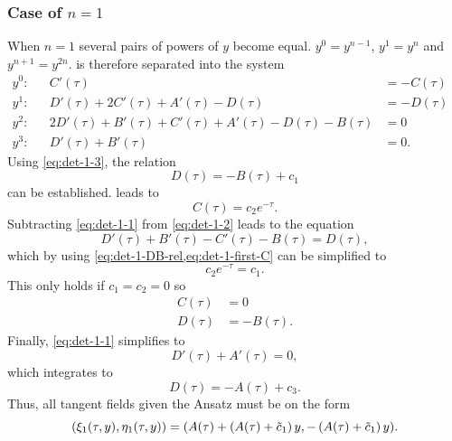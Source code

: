 \subsubsection{Case of \texorpdfstring{\(n=1\)}{n is 1}}

When \(n=1\) several pairs of powers of \(y\) become equal.
\(y^0 = y^{n-1}\), \(y^1 = y^n\) and \(y^{n+1} = y^{2n}\).
 is therefore separated into the system
\begin{subequations}
  \begin{flalign}
    y^0:  && C'(\tau) &= -C(\tau) &\label{eq:det-1-0}\\
    y^1:  && D'(\tau) + 2C'(\tau) + A'(\tau) - D(\tau) &= -D(\tau) &\label{eq:det-1-1}\\
    y^2:  && 2D'(\tau) + B'(\tau) + C'(\tau) + A'(\tau) - D(\tau) - B(\tau) &= 0 &\label{eq:det-1-2}\\
    y^3:  && D'(\tau) + B'(\tau) &= 0. &\label{eq:det-1-3}
  \end{flalign}
\end{subequations}
Using \cref{eq:det-1-3}, the relation
\begin{equation} \label{eq:det-1-DB-rel}
  D(\tau) = - B(\tau) + c_1
\end{equation}
can be established.
 leads to
\begin{equation} \label{eq:det-1-first-C}
  C(\tau) = c_2 e^{-\tau}.
\end{equation}
Subtracting \cref{eq:det-1-1} from \cref{eq:det-1-2} leads to the equation
\begin{equation*}
  D'(\tau) + B'(\tau) - C'(\tau) - B(\tau) = D(\tau),
\end{equation*}
which by using \cref{eq:det-1-DB-rel,eq:det-1-first-C} can be simplified to
\begin{equation*}
  c_2 e^{-\tau} = c_1.
\end{equation*}
This only holds if \(c_1 = c_2 = 0\) so
\begin{align}
  C(\tau) &= 0 \\
  D(\tau) &= - B(\tau).
\end{align}
Finally, \cref{eq:det-1-1} simplifies to
\begin{equation*}
  D'(\tau) + A'(\tau) = 0,
\end{equation*}
which integrates to
\begin{equation*}
  D(\tau) = - A(\tau) + c_3.
\end{equation*}
Thus, all tangent fields given the Ansatz must be on the form
\begin{equation} \label{eq:hill-tangent-field-1}
  \pqty{\xi_1(\tau,y),\eta_1(\tau,y)} = 
  \pqty{A(\tau) + \left( A(\tau) + \tilde{c}_1 \right) y, - \left( A(\tau) + \tilde{c}_1 \right) y}.
\end{equation}

